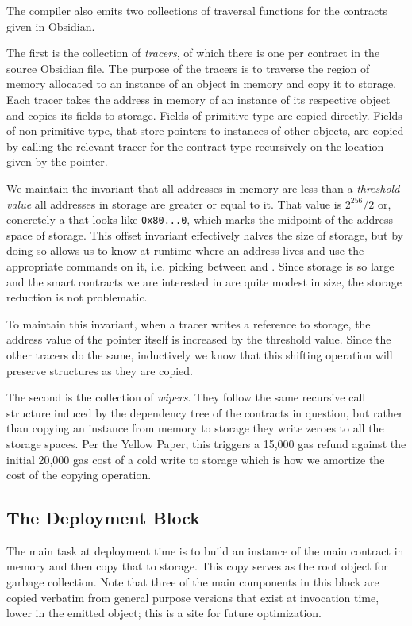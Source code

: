 The compiler also emits two collections of traversal functions for the
contracts given in Obsidian.

The first is the collection of \emph{tracers}, of which there is one per
contract in the source Obsidian file. The purpose of the tracers is to
traverse the region of memory allocated to an instance of an object in
memory and copy it to storage. Each tracer takes the address in memory of
an instance of its respective object and copies its fields to
storage. Fields of primitive type are copied directly. Fields of
non-primitive type, that store pointers to instances of other objects, are
copied by calling the relevant tracer for the contract type recursively on
the location given by the pointer.

We maintain the invariant that all addresses in memory are less than
a \emph{threshold value} all addresses in storage are greater or equal to
it. That value is $2^{256}/2$ or, concretely a  that looks
like \texttt{0x80...0}, which marks the midpoint of the address space of
storage. This offset invariant effectively halves the size of storage, but
by doing so allows us to know at runtime where an address lives and use the
appropriate commands on it, i.e. picking between 
and . Since storage is so large and the smart contracts we
are interested in are quite modest in size, the storage reduction is not
problematic.

To maintain this invariant, when a tracer writes a reference to storage,
the address value of the pointer itself is increased by the threshold
value. Since the other tracers do the same, inductively we know that this
shifting operation will preserve structures as they are copied.

The second is the collection of \emph{wipers}. They follow the same
recursive call structure induced by the dependency tree of the contracts in
question, but rather than copying an instance from memory to storage they
write zeroes to all the storage spaces. Per the Yellow Paper, this triggers
a 15,000 gas refund against the initial 20,000 gas cost of a cold write to
storage which is how we amortize the cost of the copying
operation. \cite{TODO}


\subsection{The Deployment Block}

The main task at deployment time is to build an instance of the main
contract in memory and then copy that to storage. This copy serves as the
root object for garbage collection. Note that three of the main components
in this block are copied verbatim from general purpose versions that exist
at invocation time, lower in the emitted object; this is a site for future
optimization.

